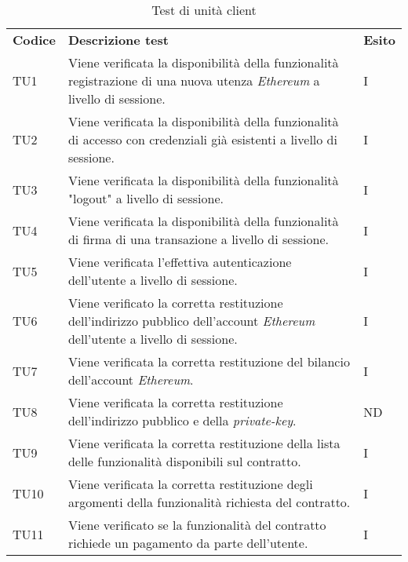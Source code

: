 \renewcommand{\arraystretch}{1.5}
\begin{longtable}{|C{1.5cm}|C{10cm}|C{1.5cm}|}

	\caption{Test di unità client}\\
	\hline

	\textbf{Codice} & \textbf{Descrizione test}  & \textbf{Esito}
	\tabularnewline
	\endfirsthead

	TU1 &
	Viene verificata la disponibilità della funzionalità registrazione di una nuova utenza \textit{Ethereum\glo} a livello di sessione.  &
	I \\

	TU2 &
	Viene verificata la disponibilità della funzionalità di accesso con credenziali già esistenti a livello di sessione.  &
	I \\

	TU3 &
	Viene verificata la disponibilità della funzionalità "logout" a livello di sessione.  &
	I \\

	TU4 &
	Viene verificata la disponibilità della funzionalità di firma di una transazione a livello di sessione.  &
	I \\

	TU5 &
	Viene verificata l'effettiva autenticazione dell'utente a livello di sessione.  &
	I \\

	TU6 &
	Viene verificato la corretta restituzione dell'indirizzo pubblico dell'account \textit{Ethereum\glo} dell'utente a livello di sessione.  &
	I \\

	TU7 &
	Viene verificata la corretta restituzione del bilancio dell'account \textit{Ethereum\glos}.  &
	I \\

	TU8 &
	Viene verificata la corretta restituzione dell'indirizzo pubblico e della \textit{private-key\glos}.  &
	ND \\

	TU9 &
	Viene verificata la corretta restituzione della lista delle funzionalità disponibili sul contratto.  &
	I \\

	TU10 &
	Viene verificata la corretta restituzione degli argomenti della funzionalità richiesta del contratto.  &
	I \\

	TU11 &
	Viene verificato se la funzionalità del contratto richiede un pagamento da parte dell'utente.  &
	I \\


\end{longtable}
